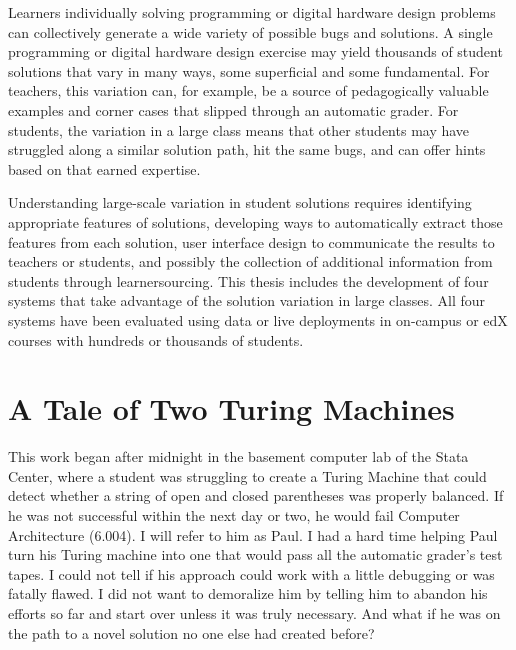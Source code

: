 Learners individually solving programming or digital hardware design problems can collectively generate a wide variety of possible bugs and solutions. A single programming or digital hardware design exercise may yield thousands of student solutions that vary in many ways, some superficial and some fundamental. For teachers, this variation can, for example, be a source of pedagogically valuable examples and corner cases that slipped through an automatic grader. For students, the variation in a large class means that other students may have struggled along a similar solution path, hit the same bugs, and can offer hints based on that earned expertise. 

Understanding large-scale variation in student solutions requires identifying appropriate features of solutions, developing ways to automatically extract those features from each solution, user interface design to communicate the results to teachers or students, and possibly the collection of additional information from students through learnersourcing. This thesis includes the development of four systems that take advantage of the solution variation in large classes. All four systems have been evaluated using data or live deployments in on-campus or edX courses with hundreds or thousands of students.

\section{A Tale of Two Turing Machines}

This work began after midnight in the basement computer lab of the Stata Center, where a student was struggling to create a Turing Machine that could detect whether a string of open and closed parentheses was properly balanced. If he was not successful within the next day or two, he would fail Computer Architecture (6.004). I will refer to him as Paul. I had a hard time helping Paul turn his Turing machine into one that would pass all the automatic grader's test tapes. I could not tell if his approach could work with a little debugging or was fatally flawed. I did not want to demoralize him by telling him to abandon his efforts so far and start over unless it was truly necessary. And what if he was on the path to a novel solution no one else had created before?

